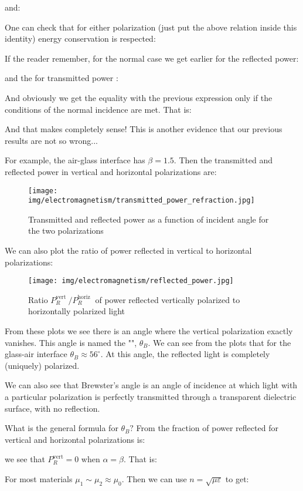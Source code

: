 	and:
	
	One can check that for either polarization (just put the above relation inside this identity) energy conservation is respected:
	
	If the reader remember, for the normal case we get earlier for the reflected power:
	
	and the for transmitted power :
	
	And obviously we get the equality with the previous expression only if the conditions of the normal incidence are met. That is:
	
	And that makes completely sense! This is another evidence that our previous results are not so wrong...

	For example, the air-glass interface has $\beta=1.5$. Then the transmitted and reflected power in vertical and horizontal polarizations are:
	\begin{figure}[H]
		\centering
		\texttt{[image: img/electromagnetism/transmitted\_power\_refraction.jpg]}
		\caption{Transmitted and reflected power as a function of incident angle for the two polarizations}
	\end{figure}
	We can also plot the ratio of power reflected in vertical to horizontal polarizations:
	\begin{figure}[H]
		\centering
		\texttt{[image: img/electromagnetism/reflected\_power.jpg]}
		\caption{Ratio $P_{R}^{\text {vert }} / P_{R}^{\text {horiz }}$ of power reflected vertically polarized to horizontally polarized light}
	\end{figure}
	From these plots we see there is an angle where the vertical polarization exactly vanishes. This angle is named the "", $\theta_{B}$. We can see from the plots that for the glass-air interface $\theta_{B} \approx 56^{\circ}$. At this angle, the reflected light is completely (uniquely) polarized.
	
	We can also see that Brewster's angle is an angle of incidence at which light with a particular polarization is perfectly transmitted through a transparent dielectric surface, with no reflection. 
	
	What is the general formula for $\theta_{B} ?$ From the fraction of power reflected for vertical and horizontal polarizations is:
	
	we see that $P_{R}^{\mathrm{vert}}=0$ when $\alpha=\beta$. That is:
	
	For most materials $\mu_{1} \sim \mu_{2} \approx \mu_{0}$. Then we can use $n=\sqrt{\mu \varepsilon}$ to get:
	
